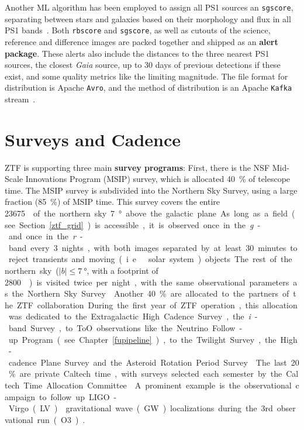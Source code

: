 Another ML algorithm has been employed to assign all PS1 sources an \texttt{sgscore}, separating between stars and galaxies based on their morphology and flux in all PS1 bands~. Both \texttt{rbscore} and \texttt{sgscore}, as well as cutouts of the science, reference and difference images are packed together and shipped as an \textbf{alert package}. These alerts also include the distances to the three nearest PS1 sources, the closest \textit{Gaia} source, up to 30 days of previous detections if these exist, and some quality metrics like the limiting magnitude. The file format for distribution is Apache \texttt{Avro}, and the method of distribution is an Apache \texttt{Kafka} stream~.

\section{Surveys and Cadence}\label{surveys}
ZTF is supporting three main \textbf{survey programs}: First, there is the NSF Mid-Scale Innovations Program (MSIP) survey, which is allocated \SI{40}{\percent} of telescope time. The MSIP survey is subdivided into the Northern Sky Survey, using a large fraction (\SI{85}{\percent}) of MSIP time. This survey covers the entire \SI{23675}{\square\deg} of the northern sky \SI{7}{\degree} above the galactic plane. As long as a field (see Section~\ref{ztf_grid}) is accessible, it is observed once in the \textit{g}- and once in the \textit{r}-band every 3 nights, with both images separated by at least 30 minutes to reject transients and moving (i.e.\ solar system) objects. The rest of the northern sky ($|b|\leq \SI{7}{\degree}$, with a footprint of \SI{2800}{\square\deg}) is visited twice per night, with the same observational parameters as the Northern Sky Survey~\cite{Bellm2019a}.

Another \SI{40}{\percent} are allocated to the partners of the ZTF collaboration. During the first year of ZTF operation, this allocation was dedicated to the Extragalactic High Cadence Survey, the \textit{i}-band Survey, to ToO observations like the Neutrino Follow-up Program (see Chapter~\ref{fupipeline}), to the Twilight Survey, the High-cadence Plane Survey and the Asteroid Rotation Period Survey~\cite{Bellm2019a}.

The last \SI{20}{\percent} are private Caltech time, with surveys selected each semester by the Caltech Time Allocation Committee~\cite{Bellm2019a}. A prominent example is the observational campaign to follow up 
LIGO-Virgo (LV)~ gravitational wave (GW) localizations during the 3rd observational run (O3)~.
